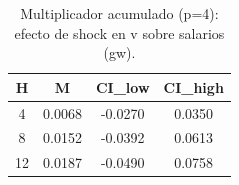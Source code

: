 \begin{table}[htbp]
\centering
\caption{Multiplicador acumulado (p=4): efecto de shock en v sobre salarios (gw).}
\label{tab_mult_gw_p4}
\footnotesize
\begin{tabular}{cccc}
\toprule
H & M & CI_low & CI_high \\
\midrule
 4 & 0.0068 & -0.0270 & 0.0350 \\
 8 & 0.0152 & -0.0392 & 0.0613 \\
12 & 0.0187 & -0.0490 & 0.0758 \\
\bottomrule
\end{tabular}
\end{table}

